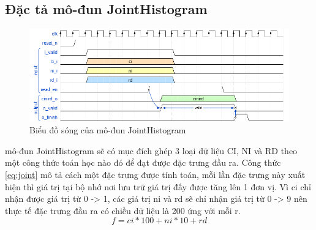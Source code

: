 \subsection{Đặc tả mô-đun JointHistogram}

\begin{figure}[H]
    \centering
    \includegraphics[width=\linewidth]{figures/jointHistogram.png}
    \caption{Biểu đồ sóng của mô-đun JointHistogram}
    \label{fig:jointHistogram}
\end{figure}
mô-đun JointHistogram sẽ có mục đích ghép 3 loại dữ liệu CI, NI và RD theo một công thức toán học nào đó để đạt được đặc trưng đầu ra. Công thức \ref{eq:joint} mô tả cách một đặc trưng được tính toán, mỗi lần đặc trưng này xuất hiện thì giá trị tại bộ nhớ nơi lưu trữ giá trị đấy được tăng lên 1 đơn vị. Vì ci chỉ nhận được giá trị từ 0 -> 1, các giá trị ni và rd sẽ chỉ nhận giá trị từ 0 -> 9 nên thực tế đặc trưng đầu ra có chiều dữ liệu là 200 ứng với mỗi r.
\begin{equation}
    f = ci*100 + ni*10 + rd
    \label{eq:joint}
\end{equation}
